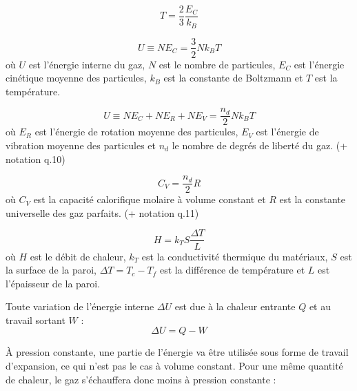 \documentclass	[11pt, a4paper, openany]{book}
\begin{document}
	$$ T = \frac{2}{3} \frac{E_C}{k_B}$$
	
	
	$$ U \equiv NE_C = \frac{3}{2}Nk_BT$$ où $U$ est l’énergie interne du gaz, $N$ est le nombre de particules, $E_C$ est l’énergie cinétique moyenne des particules, $k_B$ est la constante de Boltzmann et $T$ est la température.
	
	
	$$U \equiv NE_C+NE_R+NE_V=\frac{n_d}{2}Nk_BT$$ où $E_R$ est l’énergie de rotation moyenne des particules, $E_V$ est l’énergie de vibration moyenne des particules et $n_d$ le nombre de degrés de liberté du gaz. (+ notation q.10)
	
	
	$$C_V=\frac{n_d}{2}R$$ où $C_V$ est la capacité calorifique molaire à volume constant et $R$ est la constante universelle des gaz parfaits. (+ notation q.11)
	
	
	$$H=k_TS\frac{\Delta T}{L}$$ où $H$ est le débit de chaleur, $k_T$ est la conductivité thermique du matériaux, $S$ est la surface de la paroi, $\Delta T = T_c-T_f$ est la différence de température et $L$ est l’épaisseur de la paroi.
	
	
	Toute variation de l’énergie interne $\Delta U$ est due à la chaleur entrante $Q$ et au travail sortant $W$ : $$\Delta U=Q-W$$
	
	
	À pression constante, une partie de l'énergie va être utilisée sous forme de travail d'expansion, ce qui n'est pas le cas à volume constant. Pour une même quantité de chaleur, le gaz s'échauffera donc moins à pression constante : 
	
\end{document}
